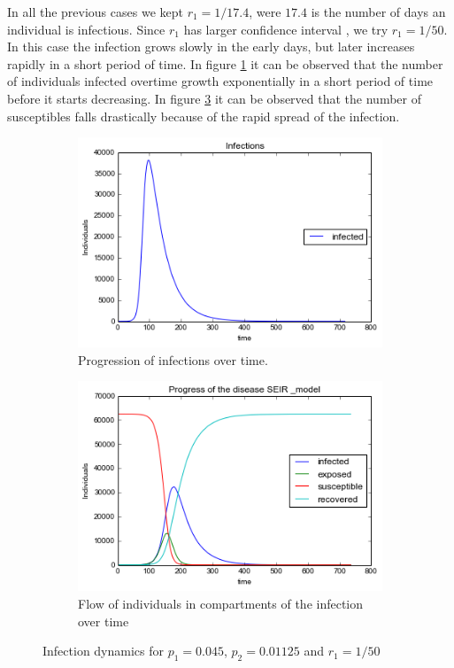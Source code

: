 In all the previous cases we kept $r_1 = 1/17.4$, were $17.4$ is the number of days an individual is infectious. Since  $r_1$ has larger confidence interval \citep{lessler2016times}, we try  $r_1 = 1/50$.  In this case the infection grows slowly in the early days, but later increases rapidly in a short period of time. In figure \ref{a51} it can be observed that the   number of individuals infected overtime growth exponentially in a short period of time before it starts decreasing. In figure \ref{a52} it can be observed that the number of susceptibles falls drastically because of the rapid spread of the infection.  

\begin{figure}[h!]
    \centering
    \begin{subfigure}[b]{0.45\textwidth}
        \includegraphics[width=\textwidth]{images/5infections}
        \caption{Progression of infections over time. }
        \label{a51}
    \end{subfigure}
     \begin{subfigure}[b]{0.45\textwidth}
        \includegraphics[width=\textwidth]{images/5SEIR}
        \caption{  Flow of individuals in compartments of the infection over time}
        \label{a52}
    \end{subfigure}
  \caption{Infection dynamics for $p_1 = 0.045 $, $p_2=0.01125$ and $r_1 = 1/50$ }
 \end{figure}

